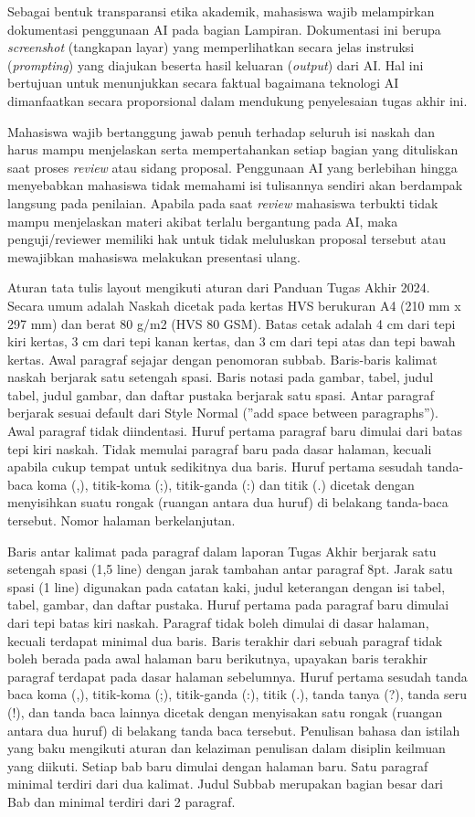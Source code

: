 Sebagai bentuk transparansi etika akademik, mahasiswa wajib melampirkan
dokumentasi penggunaan AI pada bagian Lampiran. Dokumentasi ini berupa
\emph{screenshot} (tangkapan layar) yang memperlihatkan secara jelas
instruksi (\emph{prompting}) yang diajukan beserta hasil keluaran
(\emph{output}) dari AI. Hal ini bertujuan untuk menunjukkan secara
faktual bagaimana teknologi AI dimanfaatkan secara proporsional dalam
mendukung penyelesaian tugas akhir ini.

Mahasiswa wajib bertanggung jawab penuh terhadap seluruh isi naskah dan
harus mampu menjelaskan serta mempertahankan setiap bagian yang
dituliskan saat proses \emph{review} atau sidang proposal. Penggunaan AI
yang berlebihan hingga menyebabkan mahasiswa tidak memahami isi
tulisannya sendiri akan berdampak langsung pada penilaian. Apabila pada
saat \emph{review} mahasiswa terbukti tidak mampu menjelaskan materi
akibat terlalu bergantung pada AI, maka penguji/reviewer memiliki hak
untuk tidak meluluskan proposal tersebut atau mewajibkan mahasiswa
melakukan presentasi ulang.

Aturan tata tulis layout mengikuti aturan dari Panduan Tugas Akhir 2024.
Secara umum adalah Naskah dicetak pada kertas HVS berukuran A4 (210 mm x
297 mm) dan berat 80 g/m2 (HVS 80 GSM). Batas cetak adalah 4 cm dari
tepi kiri kertas, 3 cm dari tepi kanan kertas, dan 3 cm dari tepi atas
dan tepi bawah kertas. Awal paragraf sejajar dengan penomoran subbab.
Baris-baris kalimat naskah berjarak satu setengah spasi. Baris notasi
pada gambar, tabel, judul tabel, judul gambar, dan daftar pustaka
berjarak satu spasi. Antar paragraf berjarak sesuai default dari Style
Normal (''add space between paragraphs''). Awal paragraf tidak
diindentasi. Huruf pertama paragraf baru dimulai dari batas tepi kiri
naskah. Tidak memulai paragraf baru pada dasar halaman, kecuali apabila
cukup tempat untuk sedikitnya dua baris. Huruf pertama sesudah
tanda-baca koma (,), titik-koma (;), titik-ganda (:) dan titik (.)
dicetak dengan menyisihkan suatu rongak (ruangan antara dua huruf) di
belakang tanda-baca tersebut. Nomor halaman berkelanjutan.

Baris antar kalimat pada paragraf dalam laporan Tugas Akhir berjarak
satu setengah spasi (1,5 line) dengan jarak tambahan antar paragraf 8pt.
Jarak satu spasi (1 line) digunakan pada catatan kaki, judul keterangan
dengan isi tabel, tabel, gambar, dan daftar pustaka. Huruf pertama pada
paragraf baru dimulai dari tepi batas kiri naskah. Paragraf tidak boleh
dimulai di dasar halaman, kecuali terdapat minimal dua baris. Baris
terakhir dari sebuah paragraf tidak boleh berada pada awal halaman baru
berikutnya, upayakan baris terakhir paragraf terdapat pada dasar halaman
sebelumnya. Huruf pertama sesudah tanda baca koma (,), titik-koma (;),
titik-ganda (:), titik (.), tanda tanya (?), tanda seru (!), dan tanda
baca lainnya dicetak dengan menyisakan satu rongak (ruangan antara dua
huruf) di belakang tanda baca tersebut. Penulisan bahasa dan istilah
yang baku mengikuti aturan dan kelaziman penulisan dalam disiplin
keilmuan yang diikuti. Setiap bab baru dimulai dengan halaman baru. Satu
paragraf minimal terdiri dari dua kalimat. Judul Subbab merupakan bagian
besar dari Bab dan minimal terdiri dari 2 paragraf.

